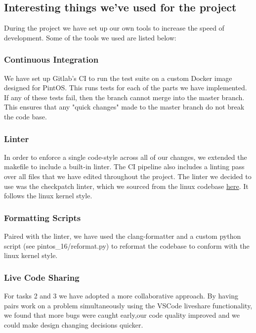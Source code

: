 \documentclass{report}
\begin{document}
		\subsection*{Interesting things we've used for the project}
		During the project we have set up our own tools to increase the speed of
		development. Some of the tools we used are listed below:

			\subsubsection*{Continuous Integration}
			We have set up Gitlab's CI to run the test suite on a custom Docker 
			image designed for PintOS. This runs tests for each of the parts we 
			have implemented. If any of these tests fail, then the branch cannot
			merge into the master branch. This ensures that any "quick changes" 
			made to the master branch do not break the code base.
			
			\subsubsection*{Linter}
			In order to enforce a single code-style across all of our changes, 
			we extended the makefile to include a built-in linter. The CI 
			pipeline also includes a linting pass over all files that we have 
			edited throughout the project. The linter we decided to use was 
			the checkpatch linter, which we sourced from the linux codebase 
			\href{https://github.com/torvalds/linux/blob/master/scripts
			/checkpatch.pl}{here}. It follows the linux kernel style.
			
			\subsubsection*{Formatting Scripts}
			Paired with the linter, we have used the clang-formatter and a 
			custom python script (see pintos\_16/reformat.py) to reformat the 
			codebase to conform with the linux kernel style. 

			\subsubsection*{Live Code Sharing}
			For tasks 2 and 3 we have adopted a more collaborative approach. 
			By having pairs work on a problem simultaneously using the 
			VSCode liveshare functionality, we found that more bugs were caught 
			early,our code quality improved and we could make design 
			changing decisions quicker.
\end{document}
